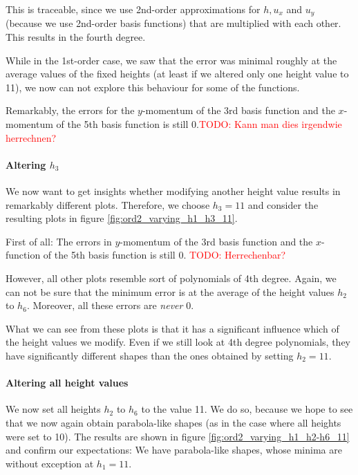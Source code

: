 \documentclass{article}
\newcommand{\todo}[1]{\textcolor{red}{TODO: #1}}
\begin{document}
This is traceable, since we use 2nd-order approximations for $h, u_x$ and $u_y$ (because we use 2nd-order basis functions) that are multiplied with each other. This results in the fourth degree.

While in the 1st-order case, we saw that the error was minimal roughly at the average values of the fixed heights (at least if we altered only one height value to 11), we now can not explore this behaviour for some of the functions.

Remarkably, the errors for the $y$-momentum of the 3rd basis function and the $x$-momentum of the 5th basis function is still 0.\todo{Kann man dies irgendwie herrechnen?}

\paragraph{Altering $h_3$}

We now want to get insights whether modifying another height value results in remarkably different plots. Therefore, we choose $h_3=11$ and consider the resulting plots in figure \ref{fig:ord2_varying_h1_h3_11}.



First of all: The errors in $y$-momentum of the 3rd basis function and the $x$-function of the 5th basis function is still 0. \todo{Herrechenbar?} 

However, all other plots resemble sort of polynomials of 4th degree. Again, we can not be sure that the minimum error is at the average of the height values $h_2$ to $h_6$. Moreover, all these errors are \emph{never} 0.

What we can see from these plots is that it has a significant influence which of the height values we modify. Even if we still look at 4th degree polynomials, they have significantly different shapes than the ones obtained by setting $h_2=11$.

\paragraph{Altering all height values}

We now set all heights $h_2$ to $h_6$ to the value 11. We do so, because we hope to see that we now again obtain parabola-like shapes (as in the case where all heights were set to 10). The results are shown in figure \ref{fig:ord2_varying_h1_h2-h6_11} and confirm our expectations: We have parabola-like shapes, whose minima are without exception at $h_1=11$.
\end{document}

